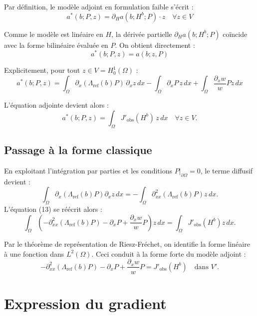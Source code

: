 \documentclass{article}
\begin{document}
Par définition, le modèle adjoint en formulation faible s'écrit :  
\[
a^*(b; P, z) = \partial_H a(b; H^b; P) \cdot z \quad \forall z \in V
\]  

Comme le modèle est linéaire en \( H \), la dérivée partielle \( \partial_H a(b; H^b; P) \) coïncide avec la forme bilinéaire évaluée en \( P \). On obtient directement :  
\[
a^*(b; P, z) = a(b; z, P) 
\]  

Explicitement, pour tout \( z \in V = H^1_0(\Omega) \) :  
\[
a^*(b; P, z) = \int_\Omega \partial_x(\Lambda_{\text{ref}}(b) P) \, \partial_x z \, dx - \int_\Omega \partial_x P \, z \, dx + \int_\Omega \frac{\partial_x w}{w} P z \, dx \tag{14}
\]  

L'équation adjointe devient alors :  
\[
a^*(b; P, z) = \int_\Omega J'_{\text{obs}}(H^b) \, z \, dx \quad \forall z \in V. \tag{13}
\]  


\subsection{Passage à la forme classique}  
En exploitant l'intégration par parties et les conditions \( P|_{\partial\Omega} = 0 \), le terme diffusif devient :  
\begin{equation}
\int_\Omega \partial_x\left(\Lambda_{\text{ref}}(b) P\right) \partial_x z \, dx = -\int_\Omega \partial_{xx}^2\left(\Lambda_{\text{ref}}(b) P\right) z \, dx. \tag{15}
\end{equation}  
L'équation (13) se réécrit alors :  
\begin{equation}
\int_\Omega \left(-\partial_{xx}^2\left(\Lambda_{\text{ref}}(b) P\right) - \partial_x P + \frac{\partial_x w}{w} P \right) z \, dx = \int_\Omega J'_{\text{obs}}(H^b) z \, dx. \tag{16}
\end{equation}  

Par le théorème de représentation de Riesz-Fréchet, on identifie la forme linéaire à une fonction dans \( L^2(\Omega) \). Ceci conduit à la forme forte du modèle adjoint :  
\begin{equation}
-\partial_{xx}^2\left(\Lambda_{\text{ref}}(b) P\right) - \partial_x P + \frac{\partial_x w}{w} P = J'_{\text{obs}}(H^b) \quad \text{dans } V'. \tag{17}
\end{equation}


\section{Expression du gradient}
\end{document}

